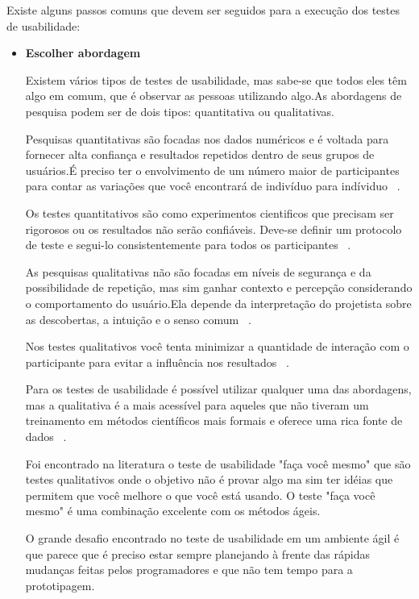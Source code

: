 	Existe alguns passos comuns que devem ser seguidos para a execução dos testes de usabilidade:

\begin{itemize}

\item \textbf{Escolher abordagem}

	Existem vários tipos de testes de usabilidade, mas sabe-se que todos eles têm algo em comum, que é observar as pessoas utilizando algo.As abordagens de pesquisa podem ser de dois tipos: quantitativa ou qualitativas. 

	Pesquisas quantitativas são focadas nos dados numéricos e é voltada para fornecer alta confiança e resultados repetidos dentro de seus grupos de usuários.É preciso ter o envolvimento de um número maior de participantes para contar as variações que você encontrará de indivíduo para indíviduo ~\cite{unger2009}.

	Os testes quantitativos são como experimentos cientificos que precisam ser rigorosos ou os resultados não serão confiáveis. Deve-se definir um protocolo de teste e segui-lo consistentemente para todos os participantes ~\cite{krug2010}.

	As pesquisas qualitativas não são focadas em níveis de segurança e da possibilidade de repetição, mas sim ganhar contexto e percepção considerando o comportamento do usuário.Ela depende da interpretação do projetista sobre as descobertas, a intuição e o senso comum ~\cite{unger2009}.

	Nos testes qualitativos você tenta minimizar a quantidade de interação com o participante para evitar a influência nos resultados ~\cite{krug2010}.

	Para os testes de usabilidade é possível utilizar qualquer uma das abordagens, mas a qualitativa é a mais acessível para aqueles que não tiveram um treinamento em métodos científicos mais formais e oferece uma rica fonte de dados ~\cite{unger2009}.

	Foi encontrado na literatura o teste de usabilidade "faça você mesmo" que são testes qualitativos onde o objetivo não é provar algo ma sim ter idéias que permitem que você melhore o que você está usando. O teste "faça você mesmo" é uma combinação excelente com os métodos ágeis. 

	O grande desafio encontrado no teste de usabilidade em um ambiente ágil é que parece que é preciso estar sempre planejando à frente das rápidas mudanças feitas pelos programadores e que não tem tempo para a prototipagem.



\end{itemize}
